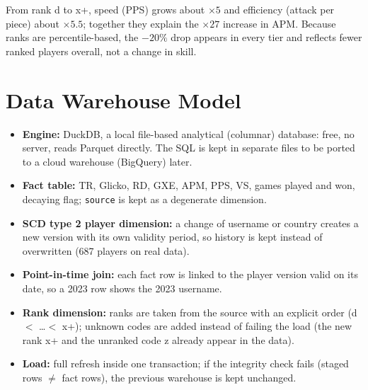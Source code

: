 \documentclass[11pt,a4paper]{article}
\begin{document}
\noindent From rank d to x+, speed (PPS) grows about $\times 5$ and efficiency
(attack per piece) about $\times 5.5$; together they explain the $\times 27$
increase in APM. Because ranks are percentile-based, the $-20\%$ drop
appears in every tier and reflects fewer ranked players overall, not a change
in skill.

\section{Data Warehouse Model}\label{sec:dw}
\begin{center}
\end{center}

\begin{itemize}
  \item \textbf{Engine:} DuckDB, a local file-based analytical (columnar)
        database: free, no server, reads Parquet directly. The SQL is kept in
        separate files to be ported to a cloud warehouse (BigQuery) later.
  \item \textbf{Fact table:} TR, Glicko, RD, GXE, APM, PPS, VS, games played
        and won, decaying flag; \texttt{source} is kept as a degenerate
        dimension.
  \item \textbf{SCD type 2 player dimension:} a change of username or country
        creates a new version with its own validity period, so history is
        kept instead of overwritten (687 players on real data).
  \item \textbf{Point-in-time join:} each fact row is linked to the player
        version valid on its date, so a 2023 row shows the 2023 username.
  \item \textbf{Rank dimension:} ranks are taken from the source with an
        explicit order (d $<$ \dots $<$ x+); unknown codes are added instead
        of failing the load (the new rank x+ and the unranked code z already
        appear in the data).
  \item \textbf{Load:} full refresh inside one transaction; if the
        integrity check fails (staged rows $\neq$ fact rows), the previous
        warehouse is kept unchanged.
\end{itemize}
\end{document}
